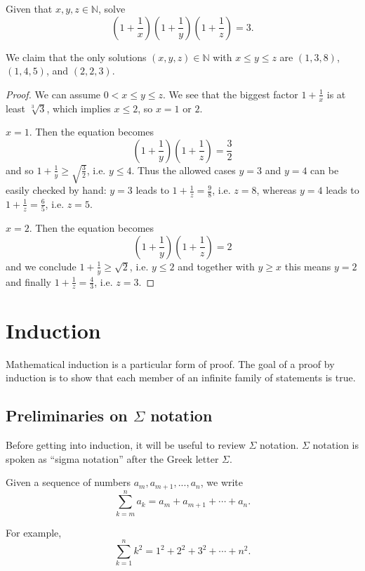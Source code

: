 \documentclass[11pt,dvipsnames]{book}
\numberwithin{figure}{section} %
\numberwithin{table}{section} %
\begin{document}
\begin{exercise} Given that $x,y,z\in\mathbb{N}$, solve
\[
\left(1+\frac{1}{x}\right)\left(1+\frac{1}{y}\right)\left(1+\frac{1}{z}\right)=3.
\]
\begin{solution}
We claim that the only solutions $(x,y,z)\in \mathbb N$ with $x\le y\le z$ are $(1,3,8)$, $(1,4,5)$, and $(2,2,3)$.

\begin{proof}
We can assume $0< x\leq y\leq z$. We see that the biggest factor $1+\frac1x$ is at least $\sqrt[3]3$, which implies $x\leq 2$, so $x=1$ or $2$.

 $x=1$. Then the equation becomes
$$\left(1+\frac1y\right)\left(1+\frac1z\right)=\frac32$$
and so $1+\frac1y\geq\sqrt{\frac32}$, i.e. $y\leq 4$.
Thus the allowed cases $y=3$ and $y=4$ can be easily checked by hand: $y=3$ leads to $1+\frac1z = \frac98$, i.e. $z=8$, whereas $y=4$ leads to $1+\frac1z = \frac{6}{5}$, i.e. $z=5$.

 $x=2$. Then the equation becomes
$$\left(1+\frac1y\right)\left(1+\frac1z\right)=2$$ and we conclude $1+\frac1y\ge\sqrt{2}$, i.e. $y\leq 2$ and together with $y\geq x$ this means $y=2$ and finally $1+\frac1z=\frac43$, i.e. $z=3$.
\end{proof}
\end{solution}
\end{exercise}


\chapter{Induction}%
\label{induction}

Mathematical induction is a particular form of proof.
The goal of a proof by induction is to show that each member of an infinite family of statements is true.

\section{Preliminaries on $\Sigma$ notation}%
\label{summationnotation}

Before getting into induction, it will be useful to review $\Sigma$ notation.
$\Sigma$ notation is spoken as ``sigma notation'' after the Greek letter $\Sigma$.
\begin{definition}
Given a sequence of numbers $a_{m},a_{m+1},...,a_{n}$, we write
\[
\sum_{k=m}^{n} a_{k} = a_{m}+a_{m+1}+\cdots +a_{n}.
\]
\end{definition}
For example,
\[
\sum_{k=1}^{n} k^2 = 1^2+2^2+3^2+\cdots + n^2.
\]
\end{document}
